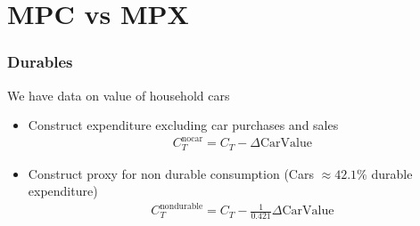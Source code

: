 \documentclass{beamer}
\begin{document}
\section{MPC vs MPX}
\frame
{
	\frametitle{Durables}
	We have data on value of household cars\\
	\begin{itemize}
		\item Construct expenditure excluding car purchases and sales
		\begin{align*}
		C_T^{\text{nocar}} = C_T - \Delta \text{CarValue}
		\end{align*}
		\item Construct proxy for non durable consumption (Cars $\approx 42.1\%$ durable expenditure)
		\begin{align*}
		C_T^{\text{nondurable}} = C_T - \frac{1}{0.421}\Delta \text{CarValue}
		\end{align*}
	\end{itemize}
}
\frame
\end{document}
